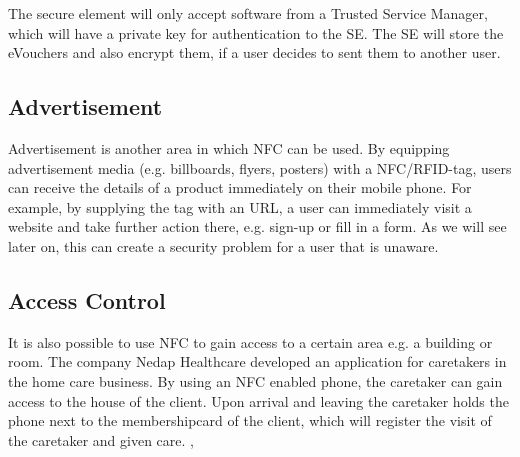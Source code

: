 The secure element will only accept software from a Trusted Service Manager, which will have a private key for authentication to the SE.
The SE will store the eVouchers and also encrypt them, if a user decides to sent them to another user. \cite{1592613}


\subsection{Advertisement}
Advertisement is another area in which NFC can be used. By equipping advertisement media (e.g. billboards, flyers, posters) with a NFC/RFID-tag, users can receive the details of a product immediately on their mobile phone.
For example, by supplying the tag with an URL, a user can immediately visit a website and take further action there, e.g. sign-up or fill in a form.
As we will see later on, this can create a security problem for a user that is unaware. \cite{mulliner2009vulnerability}

\subsection{Access Control}
It is also possible to use NFC to gain access to a certain area e.g. a building or room. The company Nedap Healthcare developed an application for caretakers in the home care business. By using an NFC enabled phone, the caretaker can gain access to the house of the client. Upon arrival and leaving the caretaker holds the phone next to the membershipcard of the client, which will register the visit of the caretaker and given care. \cite{Nedap1}, \cite{Nedap2}

